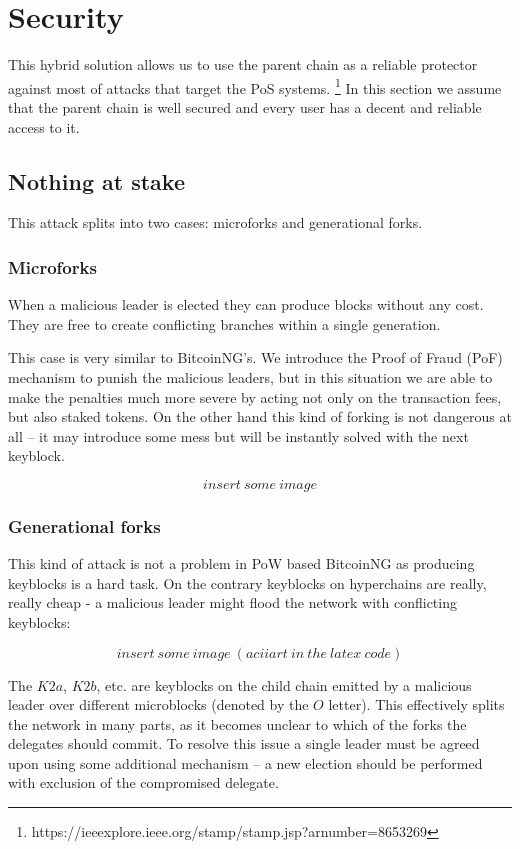\section{Security}

This hybrid solution allows us to use the parent chain as a
reliable protector against most of attacks that target the PoS systems.
\footnote{https://ieeexplore.ieee.org/stamp/stamp.jsp?arnumber=8653269}
In this section we assume that the parent chain is well secured and every
user has a decent and reliable access to it.

\subsection{Nothing at stake}

This attack splits into two cases: microforks and generational forks.

\subsubsection{Microforks}

When a malicious leader is elected they can produce blocks without any cost.
They are free to create conflicting branches within a single generation.

This case is very similar to BitcoinNG's. We introduce the Proof of Fraud (PoF)
mechanism to punish the malicious leaders, but in this situation we are able to
make the penalties much more severe by acting not only on the transaction fees,
but also staked tokens. On the other hand this kind of forking is
not dangerous at all – it may introduce some mess but will be instantly solved
with the next keyblock.

$$insert\ some\ image$$

\subsubsection{Generational forks}

This kind of attack is not a problem in PoW based BitcoinNG as producing
keyblocks is a hard task. On the contrary keyblocks on hyperchains are really,
really cheap - a malicious leader might flood the network with conflicting
keyblocks:

$$insert\ some\ image\ (aciiart\ in\ the\ latex\ code)$$

The $K2a$, $K2b$, etc. are keyblocks on the child chain emitted by a malicious
leader over different microblocks (denoted by the $O$ letter). This
effectively splits the network in many parts, as it becomes unclear to which of
the forks the delegates should commit. To resolve this issue a single leader
must be agreed upon using some additional mechanism – a new election
should be performed with exclusion of the compromised delegate.

